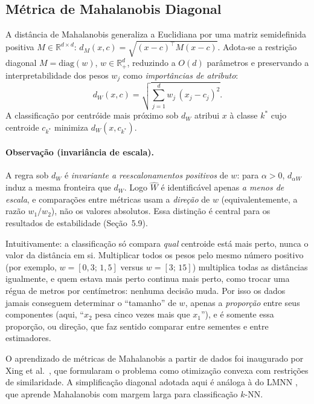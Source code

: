 \documentclass[12pt,a4paper]{article}
\newcommand{\West}{\ensuremath{\hat{W}}}   %
\begin{document}
\subsection{Métrica de Mahalanobis Diagonal}

A distância de Mahalanobis generaliza a Euclidiana por uma matriz semidefinida positiva
$M \in \mathbb{R}^{d \times d}$: $d_M(x,c) = \sqrt{(x-c)^\top M (x-c)}$. Adota-se a
restrição diagonal $M = \mathrm{diag}(w)$, $w \in \mathbb{R}^d_+$, reduzindo a $O(d)$
parâmetros e preservando a interpretabilidade dos pesos $w_j$ como \emph{importâncias de
atributo}:
\begin{equation}
  d_W(x, c) = \sqrt{\sum_{j=1}^d w_j\,(x_j - c_j)^2}.
  \label{eq:mahalanobis}
\end{equation}
A classificação por centróide mais próximo sob $d_W$ atribui $x$ à classe $k^*$ cujo centroide
$c_{k^*}$ minimiza $d_W(x, c_{k^*})$.

\paragraph{Observação (invariância de escala).}
A regra sob $d_W$ é \emph{invariante a reescalonamentos positivos} de $w$: para $\alpha>0$,
$d_{\alpha W}$ induz a mesma fronteira que $d_W$. Logo \West{} é identificável apenas
\emph{a menos de escala}, e comparações entre métricas usam a \emph{direção} de $w$
(equivalentemente, a razão $w_1/w_2$), não os valores absolutos. Essa distinção é central
para os resultados de estabilidade (Seção~5.9).

Intuitivamente: a classificação só compara \emph{qual} centroide está mais perto, nunca o
valor da distância em si. Multiplicar todos os pesos pelo mesmo número positivo (por
exemplo, $w = [0{,}3;\,1{,}5]$ versus $w = [3;\,15]$) multiplica todas as distâncias
igualmente, e quem estava mais perto continua mais perto, como trocar uma régua de metros
por centímetros: nenhuma decisão muda. Por isso os dados jamais conseguem determinar o
``tamanho'' de $w$, apenas a \emph{proporção} entre seus componentes (aqui, ``$x_2$ pesa
cinco vezes mais que $x_1$''), e é somente essa proporção, ou direção, que faz sentido
comparar entre sementes e entre estimadores.

O aprendizado de métricas de Mahalanobis a partir de dados foi inaugurado por Xing et
al.~\cite{xingDistanceMetric2002}, que formularam o problema como otimização convexa com
restrições de similaridade. A simplificação diagonal adotada aqui é análoga à do LMNN
\cite{weinbergerDistanceMetric2009}, que
aprende Mahalanobis com margem larga para classificação $k$-NN.
\end{document}
